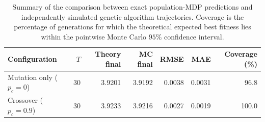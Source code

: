 \begin{table}[t]
    \centering
    \caption{Summary of the comparison between exact population-MDP predictions and independently simulated genetic algorithm trajectories. Coverage is the percentage of generations for which the theoretical expected best fitness lies within the pointwise Monte Carlo $95\%$ confidence interval.}
    \label{tab:combined-ga-trajectory-summary}
    \begin{tabular}{lrrrrrr}
        \hline
        \textbf{Configuration} & \textbf{$T$} & \textbf{Theory final} & \textbf{MC final} & \textbf{RMSE} & \textbf{MAE} & \textbf{Coverage (\%)} \\
        \hline
        Mutation only ($p_c=0$) & 30 & 3.9201 & 3.9192 & 0.0038 & 0.0031 & 96.8 \\
        Crossover ($p_c=0.9$) & 30 & 3.9233 & 3.9216 & 0.0027 & 0.0019 & 100.0 \\
        \hline
    \end{tabular}
\end{table}
